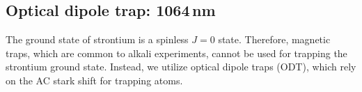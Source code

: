 %
%
%
%
%


\pagebreak
\subsection{Optical dipole trap: 1064\,nm} \label{ssec:1064sys}
\setcounter{footnote}{0}
The ground state of strontium is a spinless $J=0$ state.
Therefore, magnetic traps, which are common to alkali experiments, cannot be used for trapping the strontium ground state.
Instead, we utilize optical dipole traps (ODT), which rely on the AC stark shift for trapping atoms.

